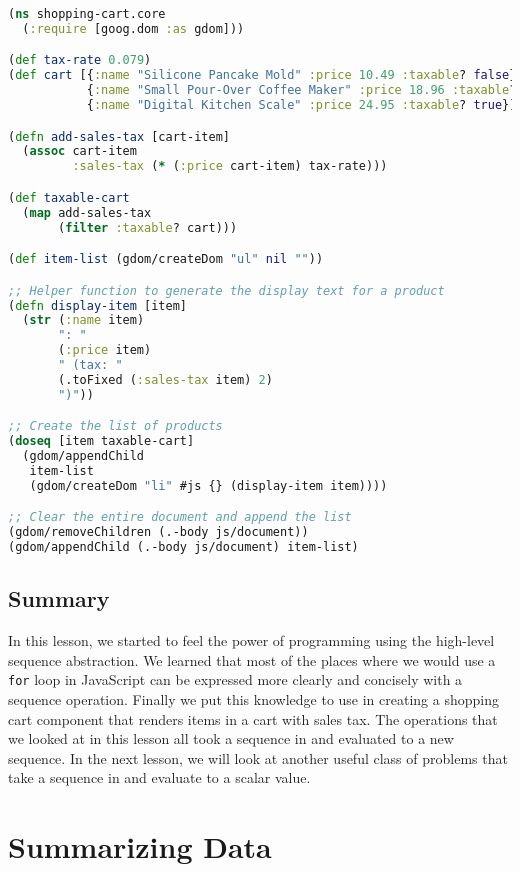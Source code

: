 \documentclass[10pt,twoside,openright]{memoir}
\begin{document}
\begin{lstlisting}[language=Clojure, caption={Rendering a shopping cart}]
(ns shopping-cart.core
  (:require [goog.dom :as gdom]))

(def tax-rate 0.079)
(def cart [{:name "Silicone Pancake Mold" :price 10.49 :taxable? false}
           {:name "Small Pour-Over Coffee Maker" :price 18.96 :taxable? true}
           {:name "Digital Kitchen Scale" :price 24.95 :taxable? true}])

(defn add-sales-tax [cart-item]
  (assoc cart-item
         :sales-tax (* (:price cart-item) tax-rate)))

(def taxable-cart
  (map add-sales-tax
       (filter :taxable? cart)))

(def item-list (gdom/createDom "ul" nil ""))

;; Helper function to generate the display text for a product
(defn display-item [item]
  (str (:name item)
       ": "
       (:price item)
       " (tax: "
       (.toFixed (:sales-tax item) 2)
       ")"))

;; Create the list of products
(doseq [item taxable-cart]
  (gdom/appendChild
   item-list
   (gdom/createDom "li" #js {} (display-item item))))

;; Clear the entire document and append the list
(gdom/removeChildren (.-body js/document))
(gdom/appendChild (.-body js/document) item-list)
\end{lstlisting}


\section{Summary}

In this lesson, we started to feel the power of programming using the
high-level sequence abstraction. We learned that most of the places
where we would use a \texttt{for} loop in JavaScript can be expressed
more clearly and concisely with a sequence operation. Finally we put
this knowledge to use in creating a shopping cart component that renders
items in a cart with sales tax. The operations that we looked at in this
lesson all took a sequence in and evaluated to a new sequence. In the
next lesson, we will look at another useful class of problems that take
a sequence in and evaluate to a scalar value.


\chapter{Summarizing Data}
\end{document}
